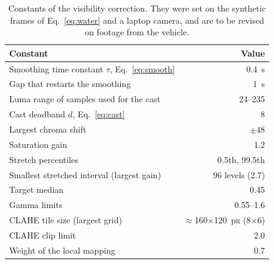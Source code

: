 \begin{table}[!t]
  \centering\small
  \caption{Constants of the visibility correction. They were set on
    the synthetic
    frames of Eq.~\eqref{eq:water} and a laptop camera, and are to be revised on
  footage from the vehicle.}\label{tab:autovis}
  \begin{tabular}{@{}L{5.4cm}r@{}}
    \toprule
    Constant & Value \\
    \midrule
    Smoothing time constant $\tau$, Eq.~\eqref{eq:smooth} & 0.4~s \\
    Gap that restarts the smoothing & 1~s \\
    Luma range of samples used for the cast & 24--235 \\
    Cast deadband $d$, Eq.~\eqref{eq:cast} & 8 \\
    Largest chroma shift & $\pm 48$ \\
    Saturation gain & 1.2 \\
    Stretch percentiles & 0.5th, 99.5th \\
    Smallest stretched interval (largest gain) & 96 levels (2.7) \\
    Target median & 0.45 \\
    Gamma limits & 0.55--1.6 \\
    CLAHE tile size (largest grid) & $\approx$160$\times$120~px (8$\times$6) \\
    CLAHE clip limit & 2.0 \\
    Weight of the local mapping & 0.7 \\
    \bottomrule
  \end{tabular}
\end{table}
